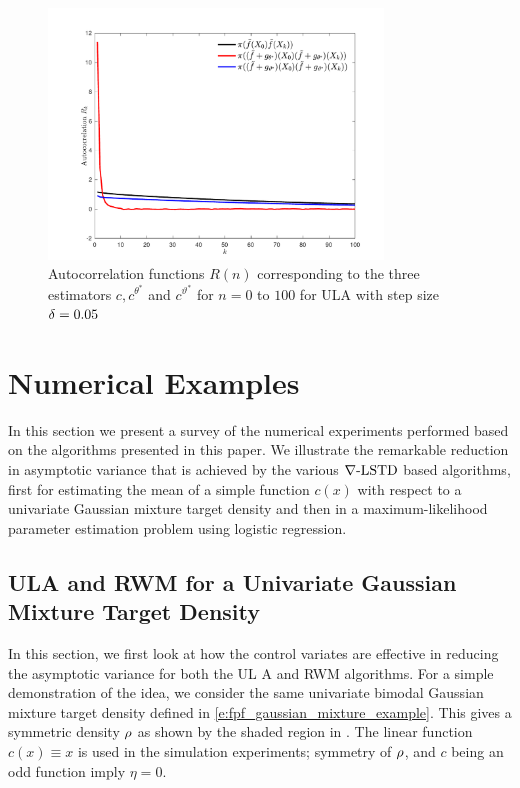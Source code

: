 \begin{figure}[htbp]
	\centering
	\includegraphics[width=3.5in]{images/Chap5_cov_R_n_gamma_pt05}
	\caption{ Autocorrelation functions $R(n)$ corresponding to the three estimators $c, c^{\theta^*}$ and $c^{\vartheta^*}$  for $n= 0$ to $100$ for ULA with step size $\delta = 0.05$}
	\label{fig:mcmc_auto_correlation}
\end{figure}

\section{Numerical Examples}
\label{s:mcmc_numerics}
In this section we present a survey of the numerical experiments performed based on the algorithms presented in this paper. We illustrate the remarkable reduction in asymptotic variance that is achieved by the various $\nabla\text{-LSTD}$ based algorithms, first for estimating the mean of a simple function $c(x)$ with respect to a univariate Gaussian mixture target density and then in a maximum-likelihood parameter estimation problem using logistic regression.   

\subsection{ULA and RWM for a Univariate Gaussian Mixture Target Density}
\label{s:mcmc_ex_avar}
In this section, we first look at how the control variates are effective in reducing the asymptotic variance for both the UL  A and RWM algorithms.  For a simple demonstration of the idea, we consider the same univariate bimodal Gaussian mixture target density defined in \eqref{e:fpf_gaussian_mixture_example}. This gives a symmetric density $\rho$ as shown by the shaded region in . The linear function $c(x) \equiv x$ is used in the simulation experiments; symmetry of $\rho$, and $c$ being an odd function imply $\eta = 0$.

